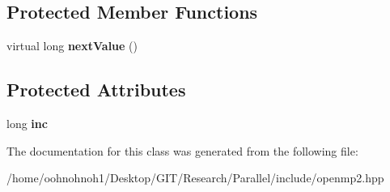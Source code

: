 \subsection*{Protected Member Functions}
\begin{DoxyCompactItemize}
\item 
\mbox{\label{classArithProgression_a257a52ae0e892ea0ed7fe29ff5b7577b}} 
virtual long {\bfseries next\+Value} ()
\end{DoxyCompactItemize}
\subsection*{Protected Attributes}
\begin{DoxyCompactItemize}
\item 
\mbox{\label{classArithProgression_abe62e738f11278d06f2b7a642963a4cf}} 
long {\bfseries inc}
\end{DoxyCompactItemize}


The documentation for this class was generated from the following file\+:\begin{DoxyCompactItemize}
\item 
/home/oohnohnoh1/\+Desktop/\+G\+I\+T/\+Research/\+Parallel/include/openmp2.\+hpp\end{DoxyCompactItemize}
